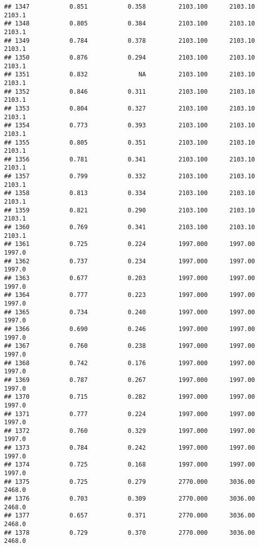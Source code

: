 \documentclass[
]{article}
\begin{document}
\begin{verbatim}
## 1347           0.851           0.358         2103.100      2103.10       2103.1
## 1348           0.805           0.384         2103.100      2103.10       2103.1
## 1349           0.784           0.378         2103.100      2103.10       2103.1
## 1350           0.876           0.294         2103.100      2103.10       2103.1
## 1351           0.832              NA         2103.100      2103.10       2103.1
## 1352           0.846           0.311         2103.100      2103.10       2103.1
## 1353           0.804           0.327         2103.100      2103.10       2103.1
## 1354           0.773           0.393         2103.100      2103.10       2103.1
## 1355           0.805           0.351         2103.100      2103.10       2103.1
## 1356           0.781           0.341         2103.100      2103.10       2103.1
## 1357           0.799           0.332         2103.100      2103.10       2103.1
## 1358           0.813           0.334         2103.100      2103.10       2103.1
## 1359           0.821           0.290         2103.100      2103.10       2103.1
## 1360           0.769           0.341         2103.100      2103.10       2103.1
## 1361           0.725           0.224         1997.000      1997.00       1997.0
## 1362           0.737           0.234         1997.000      1997.00       1997.0
## 1363           0.677           0.203         1997.000      1997.00       1997.0
## 1364           0.777           0.223         1997.000      1997.00       1997.0
## 1365           0.734           0.240         1997.000      1997.00       1997.0
## 1366           0.690           0.246         1997.000      1997.00       1997.0
## 1367           0.760           0.238         1997.000      1997.00       1997.0
## 1368           0.742           0.176         1997.000      1997.00       1997.0
## 1369           0.787           0.267         1997.000      1997.00       1997.0
## 1370           0.715           0.282         1997.000      1997.00       1997.0
## 1371           0.777           0.224         1997.000      1997.00       1997.0
## 1372           0.760           0.329         1997.000      1997.00       1997.0
## 1373           0.784           0.242         1997.000      1997.00       1997.0
## 1374           0.725           0.168         1997.000      1997.00       1997.0
## 1375           0.725           0.279         2770.000      3036.00       2468.0
## 1376           0.703           0.309         2770.000      3036.00       2468.0
## 1377           0.657           0.371         2770.000      3036.00       2468.0
## 1378           0.729           0.370         2770.000      3036.00       2468.0

\end{verbatim}
\end{document}
